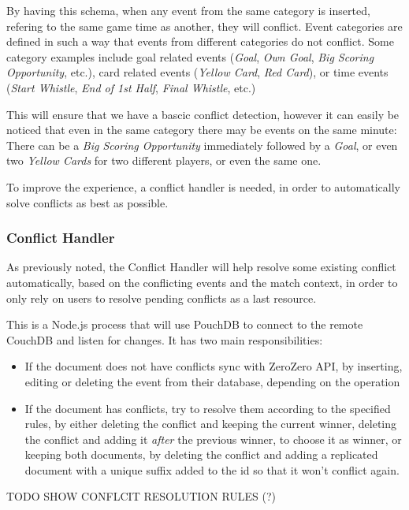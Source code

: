 By having this schema, when any event from the same category is inserted, refering to the same game time as another, they will conflict. Event categories are defined in such a way that events from different categories do not conflict. Some category examples include goal related events (\textit{Goal}, \textit{Own Goal}, \textit{Big Scoring Opportunity}, etc.), card related events (\textit{Yellow Card}, \textit{Red Card}), or time events (\textit{Start Whistle}, \textit{End of 1st Half}, \textit{Final Whistle}, etc.)

This will ensure that we have a bascic conflict detection, however it can easily be noticed that even in the same category there may be events on the same minute: There can be a \textit{Big Scoring Opportunity} immediately followed by a \textit{Goal}, or even two \textit{Yellow Cards} for two different players, or even the same one.

To improve the experience, a conflict handler is needed, in order to automatically solve conflicts as best as possible.

\subsubsection{Conflict Handler}

As previously noted, the Conflict Handler will help resolve some existing conflict automatically, based on the conflicting events and the match context, in order to only rely on users to resolve pending conflicts as a last resource.

This is a Node.js process that will use PouchDB to connect to the remote CouchDB and listen for changes. It has two main responsibilities:
\begin{itemize}
    \item If the document does not have conflicts sync with ZeroZero API, by inserting, editing or deleting the event from their database, depending on the operation
    \item If the document has conflicts, try to resolve them according to the specified rules, by either deleting the conflict and keeping the current winner, deleting the conflict and adding it \textit{after} the previous winner, to choose it as winner, or keeping both documents, by deleting the conflict and adding a replicated document with a unique suffix added to the id so that it won't conflict again.
\end{itemize}

{\Huge TODO SHOW CONFLCIT RESOLUTION RULES (?)}

